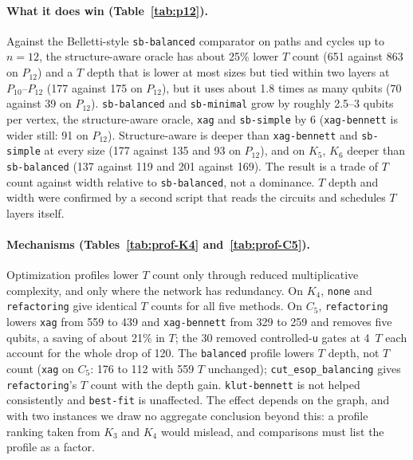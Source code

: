 \documentclass[sigconf, natbib]{acmart}
\begin{document}


\paragraph{What it does win (Table~\ref{tab:p12}).} %
Against the Belletti-style \texttt{sb-balanced} comparator on paths and cycles up to $n=12$, the structure-aware oracle has about 25\% lower $T$ count (651 against 863 on $P_{12}$) and a $T$ depth that is lower at most sizes but tied within two layers at $P_{10}$--$P_{12}$ (177 against 175 on $P_{12}$), but it uses about 1.8 times as many qubits (70 against 39 on $P_{12}$). \texttt{sb-balanced} and \texttt{sb-minimal} grow by roughly 2.5--3 qubits per vertex, the structure-aware oracle, \texttt{xag} and \texttt{sb-simple} by 6 (\texttt{xag-bennett} is wider still: 91 on $P_{12}$). Structure-aware is deeper than \texttt{xag-bennett} and \texttt{sb-simple} at every size (177 against 135 and 93 on $P_{12}$), and on $K_5$, $K_6$ deeper than \texttt{sb-balanced} (137 against 119 and 201 against 169). The result is a trade of $T$ count against width relative to \texttt{sb-balanced}, not a dominance. $T$ depth and width were confirmed by a second script that reads the circuits and schedules $T$ layers itself.

\paragraph{Mechanisms (Tables~\ref{tab:prof-K4} and~\ref{tab:prof-C5}).} %
Optimization profiles lower $T$ count only through reduced multiplicative complexity, and only where the network has redundancy. On $K_4$, \texttt{none} and \texttt{refactoring} give identical $T$ counts for all five methods. On $C_5$, \texttt{refactoring} lowers \texttt{xag} from 559 to 439 and \texttt{xag-bennett} from 329 to 259 and removes five qubits, a saving of about 21\% in $T$; the 30 removed controlled-\texttt{u} gates at 4~$T$ each account for the whole drop of 120. The \texttt{balanced} profile lowers $T$ depth, not $T$ count (\texttt{xag} on $C_5$: 176 to 112 with 559 $T$ unchanged); \texttt{cut\_esop\_balancing} gives \texttt{refactoring}'s $T$ count with the depth gain. \texttt{klut-bennett} is not helped consistently and \texttt{best-fit} is unaffected. The effect depends on the graph, and with two instances we draw no aggregate conclusion beyond this: a profile ranking taken from $K_3$ and $K_4$ would mislead, and comparisons must list the profile as a factor.
\end{document}
